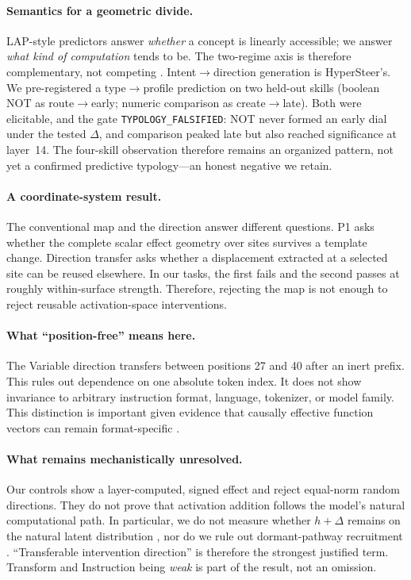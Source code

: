 \documentclass[10pt]{article}
\begin{document}
\paragraph{Semantics for a geometric divide.}
LAP-style predictors answer \emph{whether} a concept is linearly accessible;
we answer \emph{what kind of computation} tends to be. The two-regime axis is
therefore complementary, not competing
\citep{lap2026predicting,sun2025hypersteer}. Intent$\to$direction generation is
HyperSteer's. We pre-registered a type$\to$profile prediction on two held-out
skills (boolean NOT as route$\to$early; numeric comparison as
create$\to$late). Both were elicitable, and the gate
\texttt{TYPOLOGY\_FALSIFIED}: NOT never formed an early dial under the tested
$\Delta$, and comparison peaked late but also reached significance at layer~14.
The four-skill observation therefore remains an organized pattern, not yet a
confirmed predictive typology---an honest negative we retain.

\paragraph{A coordinate-system result.}
The conventional map and the direction answer different questions. P1 asks
whether the complete scalar effect geometry over sites survives a template
change. Direction transfer asks whether a displacement extracted at a selected
site can be reused elsewhere. In our tasks, the first fails and the second
passes at roughly within-surface strength. Therefore, rejecting the map is not
enough to reject reusable activation-space interventions.

\paragraph{What ``position-free'' means here.}
The Variable direction transfers between positions 27 and 40 after an inert
prefix. This rules out dependence on one absolute token index. It does not show
invariance to arbitrary instruction format, language, tokenizer, or model
family. This distinction is important given evidence that causally effective
function vectors can remain format-specific \citep{opielka2026invariance}.

\paragraph{What remains mechanistically unresolved.}
Our controls show a layer-computed, signed effect and reject equal-norm random
directions. They do not prove that activation addition follows the model's
natural computational path. In particular, we do not measure whether
$h+\Delta$ remains on the natural latent distribution
\citep{grant2026divergent}, nor do we rule out dormant-pathway recruitment
\citep{makelov2024illusion}. ``Transferable intervention direction'' is
therefore the strongest justified term. Transform and Instruction being
\emph{weak} is part of the result, not an omission.
\end{document}
